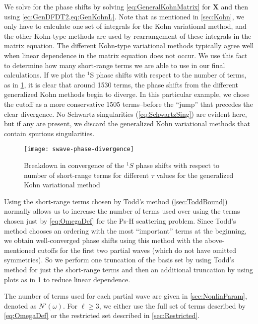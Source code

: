 \documentclass[Dissertation.tex]{subfiles}
\begin{document}
We solve for the phase shifts by solving \cref{eq:GeneralKohnMatrix} for
$\boldsymbol{X}$ and then using \cref{eq:GenDFDT2,eq:GenKohnL}. Note that
as mentioned in \cref{sec:Kohn}, we only have to calculate one set of integrals
for the Kohn variational method, and the other Kohn-type methods are
used by rearrangement of these integrals in the matrix equation. The different
Kohn-type variational methods typically agree well when linear dependence in the
matrix equation does not occur. We use this fact to determine how many
short-range terms we are able to use in our final calculations. If we plot the
$^1$S phase shifts with respect to the number of terms, as in \cref{fig:swave-phase-divergence},
it is clear that around 1530 terms, the phase shifts from the different
generalized Kohn methods begin to diverge. In this particular example, we
chose the cutoff as a more conservative 1505 terms--before the ``jump'' that 
precedes the clear divergence. No Schwartz singularities (\cref{eq:SchwartzSing})
are evident here, but if any are present, we discard the generalized Kohn
variational methods that contain spurious singularities.

\begin{figure}
	\centering
	\texttt{[image: swave-phase-divergence]}
	\caption[Breakdown in convergence of the $^1S$ phase shifts]
{Breakdown in convergence of the $^1S$ phase
shifts with respect to number of short-range terms for different $\tau$
values for the generalized Kohn variational method}
	\label{fig:swave-phase-divergence}
\end{figure}

Using the short-range terms chosen by Todd's method (\cref{sec:ToddBound})
normally allows us to increase the number of terms used over using the terms
chosen just by \cref{eq:OmegaDef} for the Ps-H scattering problem.
Since Todd's method chooses an ordering with the most ``important'' terms 
at the beginning, we obtain well-converged phase shifts using this method with
the above-mentioned cutoffs for the first two partial waves (which do not 
have omitted symmetries). So we perform one truncation of the basis set by
using Todd's method for just the short-range terms and then an additional 
truncation by using plots as in \cref{fig:swave-phase-divergence} to reduce
linear dependence.

The number of terms used for each partial wave are given in \cref{sec:NonlinParam},
denoted as $N'(\omega)$. For $\ell \geq 3$, we either use the full set of
terms described by \cref{eq:OmegaDef} or the restricted set described in
\cref{sec:Restricted}.
\end{document}
